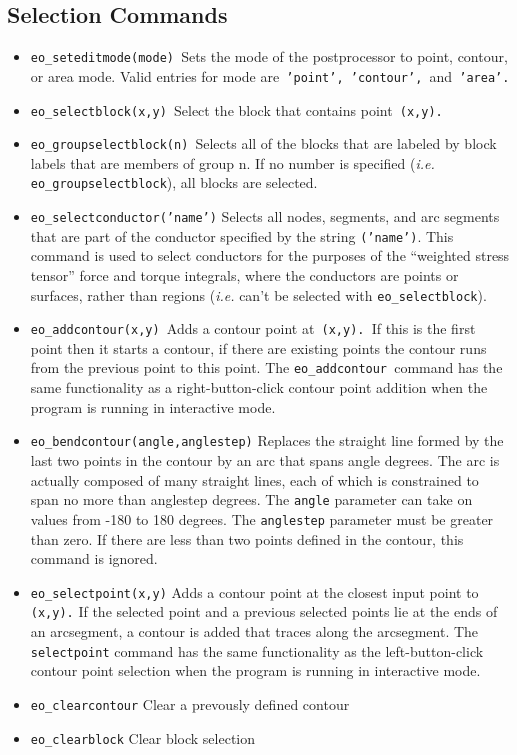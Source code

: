\subsection{Selection Commands}

\begin{itemize}
\item \texttt{eo\_seteditmode(mode) }Sets the mode of the postprocessor to point,
contour, or area mode. Valid entries for mode are\texttt{ 'point',
'contour', }and\texttt{ 'area'. }

\item \texttt{eo\_selectblock(x,y) }Select the block that contains point\texttt{
(x,y).}

\item \texttt{eo\_groupselectblock(n) }Selects all of the blocks that are labeled by
block labels that are members of group n. If no number is specified
({\em i.e.} \texttt{eo\_groupselectblock}), all blocks are selected.

\item \texttt{eo\_selectconductor('name')} Selects all nodes, segments, and arc
segments that are part of the conductor specified by the string
\texttt{('name')}. This command is used to select conductors for the
purposes of the ``weighted stress tensor'' force and torque
integrals, where the conductors are points or surfaces, rather than
regions ({\em i.e.} can't be selected with \texttt{eo\_selectblock}).

\item \texttt{eo\_addcontour(x,y) }Adds a contour point at\texttt{ (x,y). }If this is
the first point then it starts a contour, if there are existing
points the contour runs from the previous point to this point. The
\texttt{eo\_addcontour }command has the same functionality as a
right-button-click contour point addition when the program is
running in interactive mode.\texttt{ }

\item \texttt{eo\_bendcontour(angle,anglestep)} Replaces the straight line formed by
the last two points in the contour by an arc that spans angle
degrees. The arc is actually composed of many straight lines, each
of which is constrained to span no more than anglestep degrees. The
\texttt{angle} parameter can take on values from -180 to 180
degrees. The \texttt{anglestep} parameter must be greater than
zero. If there are less than two points defined in the contour,
this command is ignored.

\item \texttt{eo\_selectpoint(x,y)} Adds a contour point at the closest input point to
\texttt{(x,y).} If the selected point and a previous selected points lie at
the ends of an arcsegment, a contour is added that traces along the
arcsegment. The \texttt{selectpoint} command has the same
functionality as the left-button-click contour point selection when
the program is running in interactive mode.

\item \texttt{eo\_clearcontour} Clear a prevously defined contour

\item \texttt{eo\_clearblock} Clear block selection
\end{itemize}
